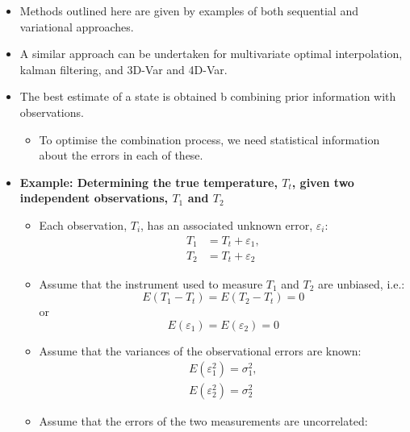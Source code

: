\begin{itemize}
    \item Methods outlined here are given by examples of both sequential and variational approaches.
    \item A similar approach can be undertaken for multivariate optimal interpolation, kalman filtering, and 3D-Var and 4D-Var.
    \item The best estimate of a state is obtained b combining prior information with observations.
    \begin{itemize}
        \item To optimise the combination process, we need statistical information about the errors in each of these.
    \end{itemize}
    \item \textbf{Example: Determining the true temperature, $T_t$, given two independent observations, $T_1$ and $T_2$}
    \begin{itemize}
        \item Each observation, $T_i$, has an associated unknown error, $\varepsilon_i$:
        \begin{subequations}
            \begin{align}
                 T_1 &= T_t + \varepsilon_1, \\
                 T_2 &= T_t + \varepsilon_2
            \end{align}
        \end{subequations}
        \item Assume that the instrument used to measure $T_1$ and $T_2$ are unbiased, i.e.:
        \begin{equation*}
            E(T_1 - T_t) = E(T_2 - T_t) = 0 
        \end{equation*}
        or
        \begin{equation}
            E(\varepsilon_1) = E(\varepsilon_2) = 0
        \end{equation}
        \item Assume that the variances of the observational errors are known:
        \begin{subequations}
            \begin{align}
                E(\varepsilon_1^2) = \sigma_1^2, \\
                E(\varepsilon_2^2) = \sigma_2^2
            \end{align}
        \end{subequations}
        \item Assume that the errors of the two measurements are uncorrelated:

\end{itemize}
\end{itemize}
